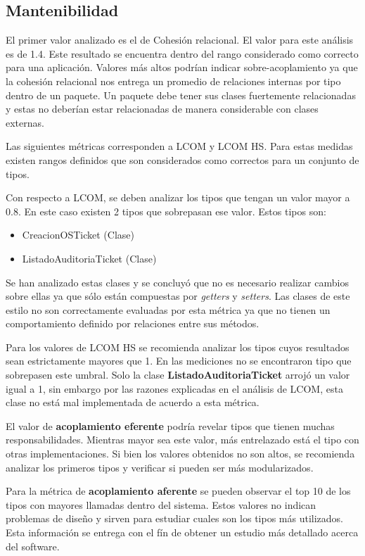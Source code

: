 \subsection{Mantenibilidad}

El primer valor analizado es el de Cohesión relacional. El valor para este
análisis es de 1.4. Este resultado se encuentra dentro del rango considerado
como correcto para una aplicación. Valores más altos podrían indicar
sobre-acoplamiento ya que la cohesión relacional nos entrega un promedio
de relaciones internas por tipo dentro de un paquete. Un paquete debe tener
sus clases fuertemente relacionadas y estas no deberían estar relacionadas de manera
considerable con clases externas.

Las siguientes métricas corresponden a LCOM y LCOM HS. Para estas medidas existen rangos definidos que
son considerados como correctos para un conjunto de tipos.

Con respecto a LCOM, se deben analizar los tipos que tengan un valor
mayor a 0.8. En este caso existen 2 tipos que sobrepasan ese valor. Estos tipos son:
\begin{itemize}
\item CreacionOSTicket (Clase)
\item ListadoAuditoriaTicket (Clase)	
\end{itemize}

Se han analizado estas clases y se concluyó que no es necesario realizar
cambios sobre ellas ya que sólo están compuestas por \textit{getters}
y \textit{setters}. Las clases de este estilo no son correctamente evaluadas
por esta métrica ya que no tienen un comportamiento definido por relaciones
entre sus métodos.

Para los valores de LCOM HS se recomienda analizar los tipos cuyos resultados
sean estrictamente mayores que 1. En las mediciones no se encontraron tipo
que sobrepasen este umbral. Solo la clase \textbf{ListadoAuditoriaTicket}
arrojó un valor igual a 1, sin embargo por las razones explicadas en el análisis
de LCOM, esta clase no está mal implementada de acuerdo a esta métrica.

El valor de \textbf{acoplamiento eferente} podría revelar tipos que tienen
muchas responsabilidades. Mientras mayor sea este valor, más entrelazado está
el tipo con otras implementaciones. Si bien los valores obtenidos no son altos,
se recomienda analizar los primeros tipos y verificar si pueden ser más modularizados.

Para la métrica de \textbf{acoplamiento aferente} se pueden observar el top 10
de los tipos con mayores llamadas dentro del sistema. Estos valores no indican
problemas de diseño y sirven para estudiar cuales son los tipos más utilizados.
Esta información se entrega con el fín de obtener un estudio más detallado
acerca del software.

